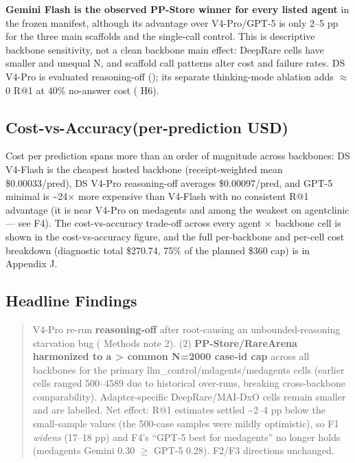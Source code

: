 \textbf{Gemini Flash is the observed PP-Store winner for every listed agent} in the
frozen manifest, although its advantage over V4-Pro/GPT-5 is only 2--5 pp for
the three main scaffolds and the single-call control. This is descriptive
backbone sensitivity, not a clean backbone main effect: DeepRare cells have
smaller and unequal N, and scaffold call patterns alter cost and failure rates.
DS V4-Pro is evaluated reasoning-off (); its separate thinking-mode
ablation adds \ensuremath{\approx}0 R@1 at 40\% no-answer cost ( H6).

\subsection{Cost-vs-Accuracy(per-prediction USD)}\label{sec-6-3}

Cost per prediction spans more than an order of magnitude across backbones:
DS V4-Flash is the cheapest hosted backbone (receipt-weighted mean
\$0.00033/pred), DS V4-Pro reasoning-off averages \$0.00097/pred,
and GPT-5 minimal is \textasciitilde24\ensuremath{\times} more expensive than V4-Flash with no consistent R@1 advantage (it is near V4-Pro on medagents and among the weakest on
agentclinic --- see F4). The
cost-vs-accuracy trade-off across every agent \ensuremath{\times} backbone cell is shown in the
cost-vs-accuracy figure, and the full per-backbone and per-cell cost breakdown
(diagnostic total \$270.74, 75\% of the planned \$360 cap) is in Appendix J.

\subsection{Headline Findings}\label{sec-6-4}

\begin{quote}
V4-Pro re-run \textbf{reasoning-off} after root-causing an unbounded-reasoning
starvation bug ( Methods note 2). (2) \textbf{PP-Store/RareArena harmonized to a \textgreater{} common N=2000 case-id cap} across all backbones for the primary
llm\_control/mdagents/medagents cells (earlier cells ranged 500--4589 due to
historical over-runs, breaking cross-backbone comparability). Adapter-specific
DeepRare/MAI-DxO cells remain smaller and are labelled. Net effect: R@1 estimates
settled \textasciitilde2--4 pp below the small-sample values (the 500-case samples were mildly
optimistic), so F1 \emph{widens} (17--18 pp) and F4's ``GPT-5 best for medagents'' no
longer holds (medagents Gemini 0.30 \ensuremath{\geq} GPT-5 0.28). F2/F3 directions unchanged.
\end{quote}

